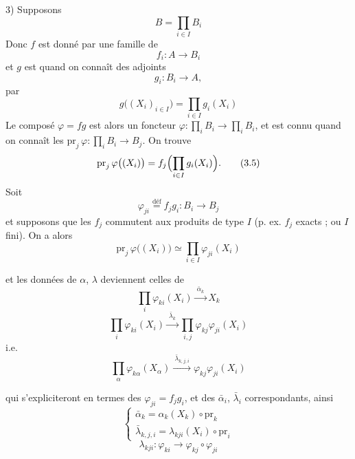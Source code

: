 \documentclass[11pt,a4paper]{article}
\begin{document}
3) Supposons
\[
  B = \prod_{i \in I} B_{i}
  \tag{3.1}
\]
Donc $f$ est donné par une famille de
\[
  f_{i} : A \longrightarrow B_{i}
  \tag{3.2}
\]
et $g$ est  quand on connaît des adjoints
\[
  g_{i} : B_{i} \longrightarrow A ,
  \tag{3.3}
\]
par
\[
  g\bigl( (X_{i})_{i \in I} \bigr) = \prod_{i \in I} g_{i}(X_{i})
  \tag{3.4}
\]
Le composé $\varphi = fg$ est alors un foncteur
$\varphi : \prod_{i} B_{i} \to \prod_{i} B_{i}$, et est connu quand on connaît
les $\mathrm{pr}_{j}\, \varphi : \prod_{i} B_{i} \to B_{j}$. On trouve
\[
  \mathrm{pr}_{j}\, \varphi\bigl( (X_{i}) \bigr)
  = f_{j}\Bigl( \prod_{i \in I} g_{i}(X_{i}) \Bigr) .
  \tag{3.5}
\]
Soit
\[
  \varphi_{ji} \overset{\text{déf}}{=} f_{j} g_{i} : B_{i} \longrightarrow B_{j}
  \tag{3.6}
\]
et supposons que les $f_{j}$ commutent aux produits de type $I$ (p. ex. $f_{j}$
exacts ; ou $I$ fini). On a alors
\[
  \mathrm{pr}_{j}\, \varphi\bigl( (X_{i}) \bigr)
  \simeq \prod_{i \in I} \varphi_{ji}(X_{i})
  \tag{3.6}
\]

et les données de $\alpha$, $\lambda$ deviennent celles de
\[
  \prod_{i} \varphi_{ki}(X_{i}) \xrightarrow{\ \bar{\alpha}_{k}\ } X_{k}
  \tag{3.7}
\]
\[
  \prod_{i} \varphi_{ki}(X_{i}) \xrightarrow{\ \bar{\lambda}_{k}\ }
  \prod_{i,j} \varphi_{kj} \varphi_{ji}(X_{i})
  \tag{3.8}
\]
i.e.
\[
  \prod_{\alpha} \varphi_{k\alpha}(X_{\alpha})
  \xrightarrow{\ \bar{\lambda}_{k,j,i}\ } \varphi_{kj} \varphi_{ji}(X_{i})
\]

qui s'expliciteront en termes des $\varphi_{ji} = f_{j} g_{i}$, et des
$\bar{\alpha}_{i}$, $\bar{\lambda}_{i}$ correspondants, ainsi
\[
  \left\{
  \begin{array}{l}
    \bar{\alpha}_{k} = \alpha_{k}(X_{k}) \circ \mathrm{pr}_{k} \\[2pt]
    \bar{\lambda}_{k,j,i} = \lambda_{kji}(X_{i}) \circ \mathrm{pr}_{i}
  \end{array}
  \right.
  \tag{3.9}
\]
\[
  \lambda_{kji} : \varphi_{ki} \longrightarrow \varphi_{kj} \circ \varphi_{ji}
  \tag{3.10}
\]

\end{document}

